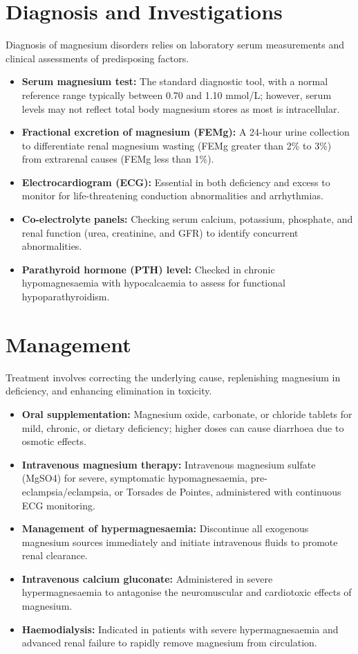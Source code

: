 \section*{Diagnosis and Investigations}
Diagnosis of magnesium disorders relies on laboratory serum measurements and clinical assessments of predisposing factors.
\begin{itemize}
    \item \textbf{Serum magnesium test:} The standard diagnostic tool, with a normal reference range typically between 0.70 and 1.10 mmol/L; however, serum levels may not reflect total body magnesium stores as most is intracellular.
    \item \textbf{Fractional excretion of magnesium (FEMg):} A 24-hour urine collection to differentiate renal magnesium wasting (FEMg greater than 2\% to 3\%) from extrarenal causes (FEMg less than 1\%).
    \item \textbf{Electrocardiogram (ECG):} Essential in both deficiency and excess to monitor for life-threatening conduction abnormalities and arrhythmias.
    \item \textbf{Co-electrolyte panels:} Checking serum calcium, potassium, phosphate, and renal function (urea, creatinine, and GFR) to identify concurrent abnormalities.
    \item \textbf{Parathyroid hormone (PTH) level:} Checked in chronic hypomagnesaemia with hypocalcaemia to assess for functional hypoparathyroidism.
\end{itemize}

\section*{Management}
Treatment involves correcting the underlying cause, replenishing magnesium in deficiency, and enhancing elimination in toxicity.
\begin{itemize}
    \item \textbf{Oral supplementation:} Magnesium oxide, carbonate, or chloride tablets for mild, chronic, or dietary deficiency; higher doses can cause diarrhoea due to osmotic effects.
    \item \textbf{Intravenous magnesium therapy:} Intravenous magnesium sulfate (MgSO4) for severe, symptomatic hypomagnesaemia, pre-eclampsia/eclampsia, or Torsades de Pointes, administered with continuous ECG monitoring.
    \item \textbf{Management of hypermagnesaemia:} Discontinue all exogenous magnesium sources immediately and initiate intravenous fluids to promote renal clearance.
    \item \textbf{Intravenous calcium gluconate:} Administered in severe hypermagnesaemia to antagonise the neuromuscular and cardiotoxic effects of magnesium.
    \item \textbf{Haemodialysis:} Indicated in patients with severe hypermagnesaemia and advanced renal failure to rapidly remove magnesium from circulation.
\end{itemize}

